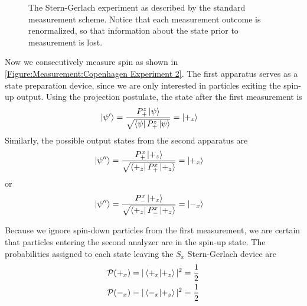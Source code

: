 \begin{figure}
\centering\CaptionFontSize
{}
\caption[Insert an abbreviated caption here to show in the List of Figures]
{The Stern-Gerlach experiment as described by the standard measurement scheme. Notice that each measurement outcome is renormalized, so that information about the state prior to measurement is lost.}
\label{Figure:Measurement:Copenhagen Experiment 2}
\end{figure}

Now we consecutively measure spin as shown in \autoref{Figure:Measurement:Copenhagen Experiment 2}. The first apparatus serves as a state preparation device, since we are only interested in particles exiting the spin-up output. Using the projection postulate, the state after the first measurement is
\begin{align}
    \ket{\psi^\prime} &= \frac{{P^z_+}\ket{\psi}}{\sqrt{\bra{\psi}P^z_+\ket{\psi}}} = \ket{+_z}
\end{align}
Similarly, the possible output states from the second apparatus are
\begin{align}
  \ket{\psi^{\prime\prime}} &= \frac{P^x_+\ket{+_z}}{\sqrt{\bra{+_z}P^x_+\ket{+_z}}} = \ket{+_x}
\end{align}
or
\begin{align}
  \ket{\psi^{\prime\prime}} &= \frac{P^x_-\ket{+_z}}{\sqrt{\bra{+_z}P^x_-\ket{+_z}}} = \ket{-_x}
\end{align}

Because we ignore spin-down particles from the first measurement, we are certain that particles entering the second analyzer are in the spin-up state. The probabilities assigned to each state leaving the $S_x$ Stern-Gerlach device are
\begin{align}
    \mathcal{P}(+_x) &= |\braket{+_x|+_z}|^2 = \frac{1}{2} \\
    \mathcal{P}(-_x) &= |\braket{-_x|+_z}|^2 = \frac{1}{2}
\end{align}

